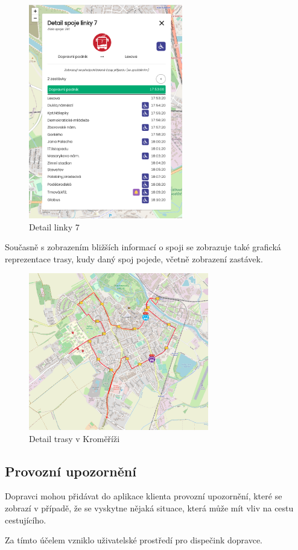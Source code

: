 \begin{figure}[H]
    \centering
    \includegraphics[width=0.6\textwidth]{images/global_pce_con_detail_7.png}
    \caption{Detail linky 7}
    \label{detail7}
\end{figure}

Současně s zobrazením bližších informací o spoji se zobrazuje také grafická reprezentace trasy, kudy daný spoj pojede, včetně zobrazení zastávek.

\begin{figure}[H]
    \centering
    \includegraphics[width=0.7\textwidth]{images/krom_line_6.png}
    \caption{Detail trasy v Kroměříži}
    \label{trasa}
\end{figure}

\subsection{Provozní upozornění}
Dopravci mohou přidávat do aplikace klienta provozní upozornění, které se zobrazí v případě, že se vyskytne nějaká situace, která může mít vliv na cestu cestujícího.\par
Za tímto účelem vzniklo uživatelské prostředí pro dispečink dopravce.

